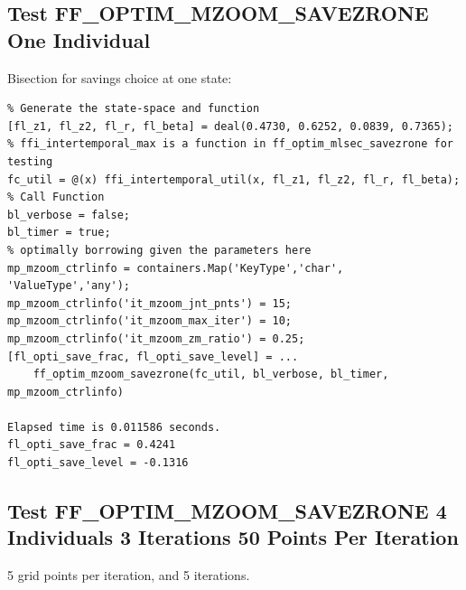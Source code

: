 \documentclass[
]{book}
\begin{document}
\hypertarget{test-ff_optim_mzoom_savezrone-one-individual}{%
\subsection{Test FF\_OPTIM\_MZOOM\_SAVEZRONE One Individual}\label{test-ff_optim_mzoom_savezrone-one-individual}}

Bisection for savings choice at one state:

\begin{verbatim}
% Generate the state-space and function
[fl_z1, fl_z2, fl_r, fl_beta] = deal(0.4730, 0.6252, 0.0839, 0.7365);
% ffi_intertemporal_max is a function in ff_optim_mlsec_savezrone for testing
fc_util = @(x) ffi_intertemporal_util(x, fl_z1, fl_z2, fl_r, fl_beta);
% Call Function
bl_verbose = false;
bl_timer = true;
% optimally borrowing given the parameters here
mp_mzoom_ctrlinfo = containers.Map('KeyType','char', 'ValueType','any');
mp_mzoom_ctrlinfo('it_mzoom_jnt_pnts') = 15;
mp_mzoom_ctrlinfo('it_mzoom_max_iter') = 10;
mp_mzoom_ctrlinfo('it_mzoom_zm_ratio') = 0.25;
[fl_opti_save_frac, fl_opti_save_level] = ...
    ff_optim_mzoom_savezrone(fc_util, bl_verbose, bl_timer, mp_mzoom_ctrlinfo)

Elapsed time is 0.011586 seconds.
fl_opti_save_frac = 0.4241
fl_opti_save_level = -0.1316
\end{verbatim}

\hypertarget{test-ff_optim_mzoom_savezrone-4-individuals-3-iterations-50-points-per-iteration}{%
\subsection{Test FF\_OPTIM\_MZOOM\_SAVEZRONE 4 Individuals 3 Iterations 50 Points Per Iteration}\label{test-ff_optim_mzoom_savezrone-4-individuals-3-iterations-50-points-per-iteration}}

5 grid points per iteration, and 5 iterations.
\end{document}
